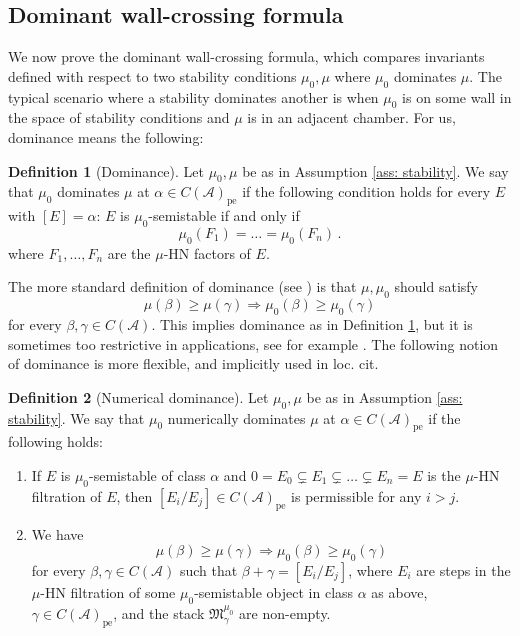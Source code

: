 \documentclass[12pt]{amsart}
\theoremstyle{definition}
\newtheorem{definition}{Definition}[section]
\newcommand{\CA}{{\mathcal A}}
\newcommand{\1}{\mathbf 1}
\newcommand{\FM}{{\mathfrak{M}}}
\newcommand{\pe}{\mathrm{pe}}
\begin{document}
\subsection{Dominant wall-crossing formula} \label{subsec: dominantWC} We now prove the dominant wall-crossing formula, which compares invariants defined with respect to two stability conditions $\mu_0, \mu$ where $\mu_0$ dominates $\mu$. The typical scenario where a stability dominates another is when $\mu_0$ is on some wall in the space of stability conditions and $\mu$ is in an adjacent chamber. For us, dominance means the following:

\begin{definition}[Dominance]\label{def: dominance}
Let $\mu_0, \mu$ be as in Assumption \ref{ass: stability}. We say that $\mu_0$ dominates $\mu$ at $\alpha\in C(\CA)_\pe$ if the following condition holds for every $E$ with $[E]=\alpha$: $E$ is $\mu_0$-semistable if and only if 
\[\mu_0(F_1)=\ldots=\mu_0(F_n)\,.\]
where $F_1, \ldots, F_n$ are the $\mu$-HN factors of $E$.
\end{definition}

The more standard definition of dominance (see \cite[Definition 4.10]{JO06III}) is that $\mu, \mu_0$ should satisfy
\[\mu(\beta)\geq \mu(\gamma)\Rightarrow \mu_0(\beta)\geq \mu_0(\gamma)\]
for every $\beta, \gamma\in C(\CA)$. This implies dominance as in Definition \ref{def: dominance}, but it is sometimes too restrictive in applications, see for example \cite[Section 4.1]{FTr0}. The following notion of dominance is more flexible, and implicitly used in loc. cit.


\begin{definition}[Numerical dominance]
Let $\mu_0, \mu$ be as in Assumption \ref{ass: stability}. We say that $\mu_0$ numerically dominates $\mu$ at $\alpha\in C(\CA)_\pe$ if the following holds:
\begin{enumerate}
    \item If $E$ is $\mu_0$-semistable of class $\alpha$ and $0=E_0\subsetneq E_1\subsetneq \ldots\subsetneq E_n=E$ is the $\mu$-HN filtration of $E$, then $[E_i/E_j]\in C(\CA)_\pe$ is permissible for any $i>j$.
    \item We have
    \[\mu(\beta)\geq \mu(\gamma)\Rightarrow \mu_0(\beta)\geq \mu_0(\gamma)\]
    for every $\beta, \gamma\in C(\CA)$ such that $\beta+\gamma=[E_i/E_j]$, where $E_i$ are steps in the $\mu$-HN filtration of some $\mu_0$-semistable object in class $\alpha$ as above, $\gamma\in C(\CA)_\pe$, and the stack $\FM_\gamma^{\mu_0}$ are non-empty.
\end{enumerate}
\end{definition}
\end{document}
